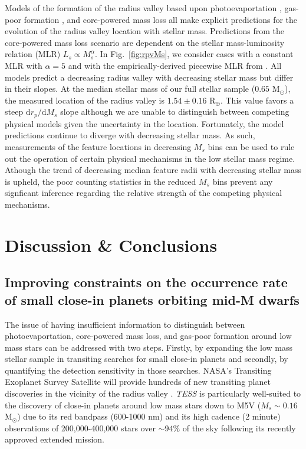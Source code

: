 \documentclass[twocolumn]{emulateapj}
\newcommand{\tess}[1]{\emph{TESS}#1}
\begin{document}
Models of the formation of the radius valley based upon photoevaportation \citep{wu19}, gas-poor formation \citep{lopez18},
and core-powered mass loss \citep{gupta19b} all make explicit predictions for the evolution of the radius valley location
with stellar mass. Predictions from the core-powered mass loss scenario are dependent on the stellar mass-luminosity
relation (MLR) $L_s \propto M_s^{\alpha}$. In Fig.~\ref{fig:rpvMs}, we consider cases with a constant MLR with $\alpha=5$
\citep{gupta19b} and with the empirically-derived piecewise MLR from \cite{eker18}. All models predict a decreasing
radius valley with decreasing stellar mass but differ in their slopes. 
At the median stellar mass of our full stellar sample ($0.65$ M$_{\odot}$), the measured location of the radius valley is
$1.54\pm 0.16$ R$_{\oplus}$. This value favors a steep $\text{d}r_p / \text{d}M_s$ slope although we are unable to distinguish
between competing physical models given the uncertainty in the location. Fortunately, the model predictions continue to diverge
with decreasing stellar mass. As such, measurements of the feature locations in decreasing $M_s$ bins can be used to
rule out the operation of certain physical mechanisms in the low stellar mass regime. Athough the trend of decreasing
median feature radii with decreasing stellar mass is upheld, the poor counting statistics in the reduced $M_s$ bins
prevent any signficant inference regarding the relative strength of the competing physical mechanisms.

\section{Discussion \& Conclusions} \label{sect:conclusion}
\subsection{Improving constraints on the occurrence rate of small close-in planets orbiting mid-M dwarfs}
The issue of having insufficient information to distinguish between photoevaportation, core-powered mass loss, and gas-poor
formation around low mass stars can be addressed with two steps. Firstly, by expanding the low mass stellar sample in transiting
searches for small close-in planets and secondly, by quantifying the detection sensitivity in those searches. 
NASA's Transiting Exoplanet Survey Satellite \citep[\tess{;}][]{ricker15} will provide hundreds of new transiting planet
discoveries in the vicinity of the radius valley \citep{barclay18}. \tess{} is particularly well-suited to the discovery of
close-in planets around low mass stars down to M5V ($M_s\sim 0.16$ M$_{\odot}$) due to its red bandpass (600-1000 nm)
and its high cadence (2 minute) observations of 200,000-400,000 stars over $\sim 94$\% of the sky following its recently
approved extended mission.
\end{document}
